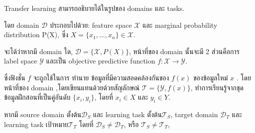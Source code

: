 Transfer learning สามารถอธิบายได้ในรูปของ domains และ tasks.

โดย domain ${\mathcal {D}}$ ประกอบไปด้วย: feature space ${\mathcal {X}}$ และ marginal probability distribution P(X),
ซึ่ง ${\displaystyle X=\{x_{1},...,x_{n}\}\in {\mathcal {X}}}$.

จะได้ว่าหากมี domain ใด, ${\displaystyle {\mathcal {D}}=\{{\mathcal {X}},P(X)\}}$,
หน้าที่ของ domain นั้นจะมี 2 ส่วนคือการ
label space ${\mathcal {Y}}$  และเป็น objective predictive function
${\displaystyle f:{\mathcal {X}}\rightarrow {\mathcal {Y}}}$.

ซึ่งฟังชั่น ${\displaystyle f}$  จะถูกใช้ในการ ทำนาย ข้อมูลที่มีความสอดคล้องกันของ  ${\displaystyle f(x)}$   ของข้อมูลใหม่  ${\displaystyle x}$ .
โดยหน้าที่ของ domain ,โดยเขียนแทนด้วยด้วยสัญลักษณ์   ${\displaystyle {\mathcal {T}}=\{{\mathcal {Y}},f(x)\}}$,
ทำการเรียนรู้จากชุดข้อมูลฝึกสอนที่เป็นคู่อันดับ ${\displaystyle \{x_{i},y_{i}\}}$, โดยที่ ${\displaystyle x_{i}\in {X}}$ และ ${\displaystyle y_{i}\in {Y}}$.

หากมี source domain ตั้งต้น${\displaystyle {\mathcal {D}}_{S}}$ และ learning task ตั้งต้น${\displaystyle {\mathcal {T}}_{S}}$,
target domain  ${\mathcal{D}_{T}}$ และ learning task เป้าหมาย${\mathcal{T}_{T}}$
โดยที่ ${\displaystyle {\mathcal {D}}_{S}\neq {\mathcal {D}}_{T}}$, หรือ ${\displaystyle {\mathcal {T}}_{S}\neq {\mathcal {T}}_{T}}$,

